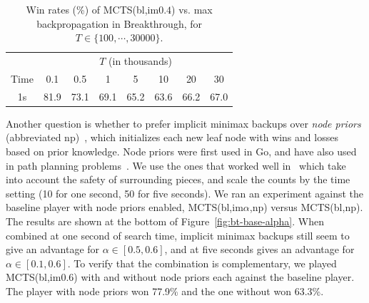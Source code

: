 \documentclass{article}
\begin{document}
\begin{table}[t!]
\begin{center}
\begin{tabular}{|c|ccccccc|}
\hline
                     & \multicolumn{7}{|c|}{$T$ (in thousands)}             \\
Time                & 0.1  & 0.5  & 1    & 5    & 10   & 20 & 30 \\
\hline
1s                 & 81.9 & 73.1 & 69.1 & 65.2 & 63.6 & 66.2 & 67.0 \\
\hline
\end{tabular}
\end{center}
\caption{Win rates (\%) of MCTS(bl,im$0.4$) vs. max backpropagation in Breakthrough, 
for $T \in \{ 100, \cdots, 30000 \}$. }
\label{tbl:maxbackprop}
\end{table}

Another question is whether to prefer implicit minimax backups over {\it node priors} (abbreviated np)~\cite{Gelly07Combining}, 
which initializes each new leaf node with wins and losses based on prior knowledge. Node priors were first used in Go, 
and have also used in path planning problems~\cite{Eyerich10High}.
We use the ones that worked well in~\cite{Lorentz13Breakthrough}
which take into account the safety of surrounding pieces, and scale the counts by the 
time setting (10 for one second, 50 for five seconds).
We ran an experiment against the baseline player with node priors enabled,
MCTS(bl,im$\alpha$,np) versus MCTS(bl,np). 
The results are shown at the bottom of Figure~\ref{fig:bt-base-alpha}. When combined at one second of 
search time, implicit minimax backups still seem to give an advantage for $\alpha \in [0.5,0.6]$, and at five 
seconds gives an advantage for $\alpha \in [0.1,0.6]$. To verify that the combination is complementary,
we played MCTS(bl,im$0.6$) with and without node priors each against the baseline player. The player with
node priors won 77.9\% and the one without won 63.3\%. \\

\end{document}
